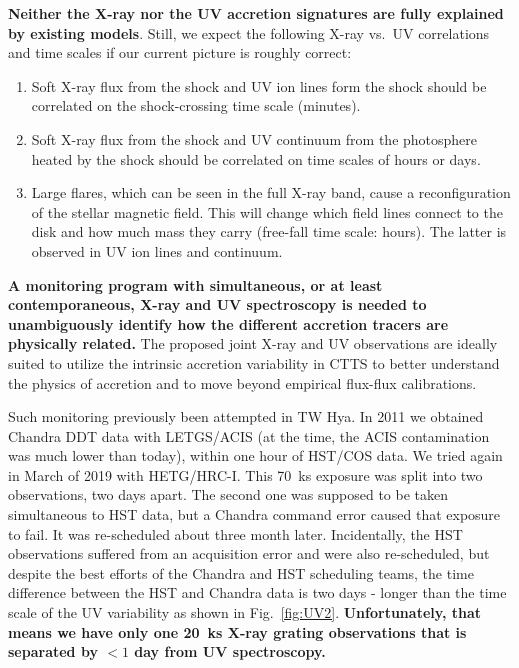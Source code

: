 \documentclass[letterpaper,11pt,twocolumn]{article}
\begin{document}
{\bf Neither the X-ray nor the UV accretion signatures are fully explained by existing models}. Still, we expect the following X-ray vs.\ UV correlations and time scales if our current picture is roughly correct:
\begin{enumerate}
    \itemsep1pt
    \item Soft X-ray flux from the shock and UV ion lines form the shock should be correlated on the shock-crossing time scale (minutes).
    \item Soft X-ray flux from the shock and UV continuum from the photosphere heated by the shock should be correlated on time scales of hours or days.
    \item Large flares, which can be seen in the full X-ray band, cause a reconfiguration of the stellar magnetic field. This will change which field lines connect to the disk and how much mass they carry (free-fall time scale: hours). The latter is observed in UV ion lines and continuum.
\end{enumerate}

\textbf{A monitoring program with simultaneous, or at least contemporaneous, X-ray and UV spectroscopy
is needed to unambiguously identify how the different 
accretion tracers are physically related.} The proposed joint X-ray and UV observations are ideally
suited to utilize the intrinsic accretion variability in
CTTS to better understand the physics of accretion and to move beyond 
empirical flux-flux calibrations. 

Such monitoring previously been attempted in TW Hya. In 2011 we obtained Chandra DDT
data with LETGS/ACIS (at the time, the ACIS contamination was much lower than
today), within one hour of HST/COS data.
We tried again in March of 2019 with HETG/HRC-I. This 70~ks exposure was split into two
observations, two days apart. The second one was supposed to be taken simultaneous to HST data,
but a Chandra command error caused that exposure to fail. It was
re-scheduled about three month later. Incidentally, the HST observations
suffered from an acquisition error and were also re-scheduled, but despite the
best efforts of the Chandra and HST scheduling teams, the time difference
between the HST and Chandra data is two days - longer than the time scale of the
UV variability as shown in Fig.~\ref{fig:UV2}. \textbf{Unfortunately, that
  means we have only one 20~ks X-ray grating observations that is separated by
  $<1$ day from UV spectroscopy.}
\end{document}
